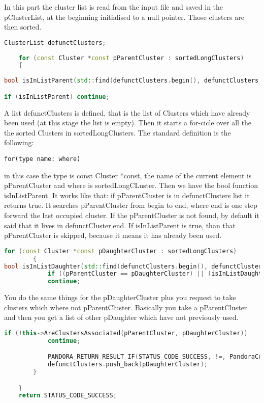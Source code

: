 In this part the cluster list is read from the input file and saved in the pClusterList, at the beginning initialised to a null pointer. Those clusters are then sorted.

\begin{lstlisting}[language=C++]
ClusterList defunctClusters;
	
	for (const Cluster *const pParentCluster : sortedLongClusters)
	{
 
bool isInListParent(std::find(defunctClusters.begin(), defunctClusters.end(), pParentCluster) != defunctClusters.end());

if (isInListParent) continue;
\end{lstlisting}

A list defunctClusters is defined, that is the list of Clusters which have already been used (at this stage the list is empty). Then it starts a for-cicle over all the the sorted Clusters in sortedLongClusters. The standard definition is the following:

\begin{verbatim}
for(type name: where)
\end{verbatim} 
in this case the type is const Cluster *const, the name of the current element is pParentCluster and where is sortedLongCLuster. Then we have the bool function isInListParent. It works like that: if pParentCluster is in defunctClusters list it returns true. It searches pParentCluster from begin to end, where end is one step forward the last occupied cluster. If the pParentCluster is not found, by default it said that it lives in defunctCluster.end. If isInListParent is true, than that pParentCluster is skipped, because it means it has already been used.
\begin{lstlisting}[language=C++]
for (const Cluster *const pDaughterCluster : sortedLongClusters)
		{
bool isInListDaughter(std::find(defunctClusters.begin(), defunctClusters.end(), pDaughterCluster) != defunctClusters.end());
			if ((pParentCluster == pDaughterCluster) || (isInListDaughter))
			continue;
\end{lstlisting}
You do the same things for the pDaughterCluster plus you request to take clusters which where not pParentCluster. Basically you take a pParentCluster and then you get a list of other pDaughter which have not previously used.

\begin{lstlisting}[language=C++]
			if (!this->AreClustersAssociated(pParentCluster, pDaughterCluster))
			continue;

			PANDORA_RETURN_RESULT_IF(STATUS_CODE_SUCCESS, !=, PandoraContentApi::MergeAndDeleteClusters(*this, pParentCluster, pDaughterCluster));
			defunctClusters.push_back(pDaughterCluster);
		}

	}
	return STATUS_CODE_SUCCESS;
\end{lstlisting}

